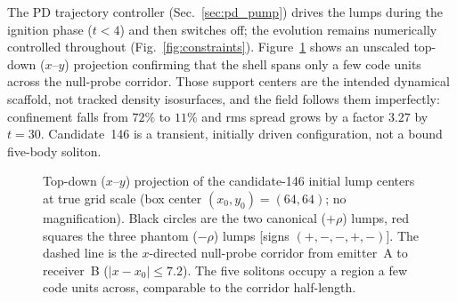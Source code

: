 \documentclass[twocolumn,floatfix,aps,prd,nofootinbib]{revtex4-2}
\begin{document}
The PD trajectory controller (Sec.~\ref{sec:pd_pump}) drives the lumps during
the ignition phase ($t<4$) and then switches off; the evolution remains
numerically controlled throughout (Fig.~\ref{fig:constraints}).
Figure~\ref{fig:lump_topdown} shows an unscaled top-down ($x$--$y$) projection
confirming that the shell spans only a few code units across the null-probe
corridor. Those support centers are the intended dynamical scaffold, not
tracked density isosurfaces, and the field follows them imperfectly:
confinement falls from $72\%$ to $11\%$ and rms spread grows by a factor $3.27$
by $t=30$. Candidate~146 is a transient, initially driven configuration, not a
bound five-body soliton.


\begin{figure}[tbp]
\centering
{}
\caption{Top-down ($x$--$y$) projection of the candidate-146 initial
lump centers at true grid scale (box center $(x_0,y_0)=(64,64)$; no
magnification). Black circles are the two canonical ($+\rho$) lumps, red
squares the three phantom ($-\rho$) lumps [signs $(+,-,-,+,-)$]. The dashed
line is the $x$-directed null-probe corridor from emitter~A to receiver~B
($|x-x_0|\le7.2$). The five solitons occupy a region a few
code units across, comparable to the corridor half-length.}
\label{fig:lump_topdown}
\end{figure}
\end{document}
